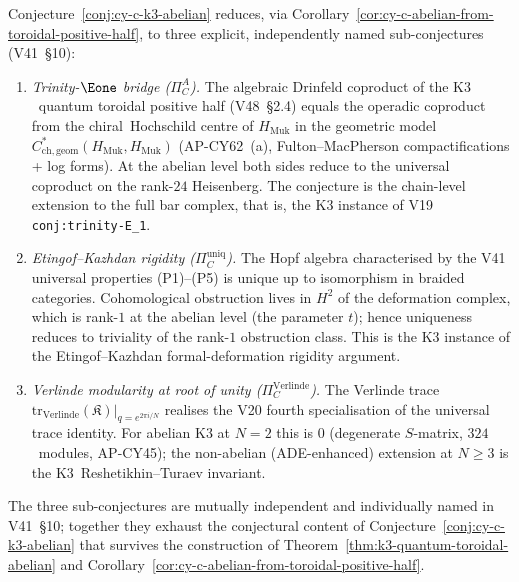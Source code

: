 \begin{remark}
\label{rem:cy-c-three-named-conjectures}
Conjecture~\ref{conj:cy-c-k3-abelian} reduces, via
Corollary~\ref{cor:cy-c-abelian-from-toroidal-positive-half}, to three
explicit, independently named sub-conjectures (V41~\S10):
\begin{enumerate}[label=\textup{($\Pi_C^{\arabic*}$)}]
\item \emph{Trinity-$\Eone$ bridge ($\Pi_C^A$).}  The algebraic Drinfeld
coproduct of the K$3$~quantum toroidal positive half (V48~\S2.4) equals
the operadic coproduct from the chiral~Hochschild centre of
$H_{\mathrm{Muk}}$ in the geometric model
$C^*_{\mathrm{ch,geom}}(H_{\mathrm{Muk}}, H_{\mathrm{Muk}})$
(AP-CY62~(a), Fulton--MacPherson compactifications + log forms).  At
the abelian level both sides reduce to the universal coproduct on the
rank-$24$ Heisenberg.  The conjecture is the chain-level extension to
the full bar complex, that is, the K$3$ instance of V19
\texttt{conj:trinity-E\_1}.

\item \emph{Etingof--Kazhdan rigidity ($\Pi_C^{\mathrm{uniq}}$).}  The
Hopf algebra characterised by the V41 universal properties
\textup{(P1)--(P5)} is unique up to isomorphism in braided categories.
Cohomological obstruction lives in $H^2$ of the deformation complex,
which is rank-$1$ at the abelian level (the parameter $t$); hence
uniqueness reduces to triviality of the rank-$1$ obstruction class.
This is the K$3$ instance of the Etingof--Kazhdan formal-deformation
rigidity argument.

\item \emph{Verlinde modularity at root of unity ($\Pi_C^{\mathrm{Verlinde}}$).}
The Verlinde trace
$\mathrm{tr}_{\mathrm{Verlinde}}(\mathfrak{K})|_{q = e^{2\pi i / N}}$
realises the V20 fourth specialisation of the universal trace identity.
For abelian K$3$ at $N = 2$ this is $0$ (degenerate $S$-matrix,
$324$~modules, AP-CY45); the non-abelian (ADE-enhanced)
extension at $N \geq 3$ is the K$3$~Reshetikhin--Turaev invariant.
\end{enumerate}
The three sub-conjectures are mutually independent and individually
named in V41~\S10; together they exhaust the conjectural content of
Conjecture~\ref{conj:cy-c-k3-abelian} that survives the construction
of Theorem~\ref{thm:k3-quantum-toroidal-abelian} and
Corollary~\ref{cor:cy-c-abelian-from-toroidal-positive-half}.
\end{remark}

